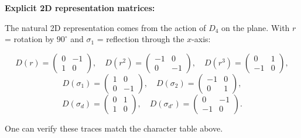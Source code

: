 \documentclass[12pt]{article}
\begin{document}
\medskip
\noindent\textbf{Explicit 2D representation matrices:}

The natural 2D representation comes from the action of $D_4$ on the plane. With $r$ = rotation by $90^\circ$ and $\sigma_1$ = reflection through the $x$-axis:

\[
D(r) = \begin{pmatrix} 0 & -1 \\ 1 & 0 \end{pmatrix}, \quad
D(r^2) = \begin{pmatrix} -1 & 0 \\ 0 & -1 \end{pmatrix}, \quad
D(r^3) = \begin{pmatrix} 0 & 1 \\ -1 & 0 \end{pmatrix},
\]
\[
D(\sigma_1) = \begin{pmatrix} 1 & 0 \\ 0 & -1 \end{pmatrix}, \quad
D(\sigma_2) = \begin{pmatrix} -1 & 0 \\ 0 & 1 \end{pmatrix},
\]
\[
D(\sigma_d) = \begin{pmatrix} 0 & 1 \\ 1 & 0 \end{pmatrix}, \quad
D(\sigma_{d'}) = \begin{pmatrix} 0 & -1 \\ -1 & 0 \end{pmatrix}.
\]

One can verify these traces match the character table above.
\end{document}
